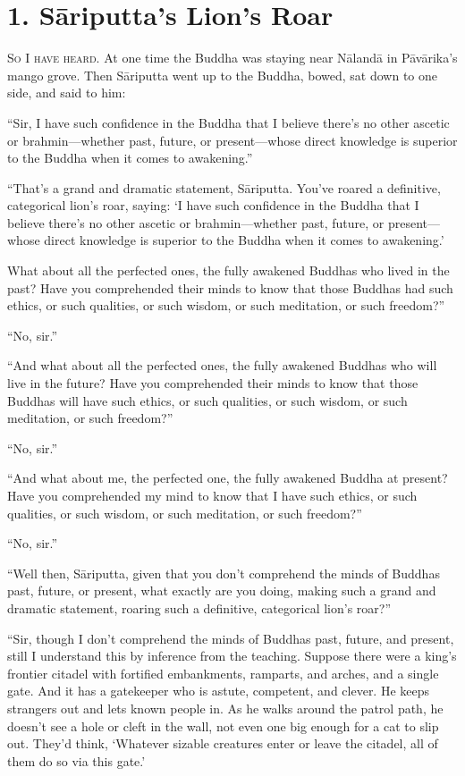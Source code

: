 \documentclass[12pt,openany]{book}%
\newcommand*{\scevam}[1]{\textsc{#1}}
\begin{document}
\section*{1. \textsanskrit{Sāriputta}’s Lion’s Roar }

\scevam{So I have heard. }At one time the Buddha was staying near \textsanskrit{Nālandā} in \textsanskrit{Pāvārika}’s mango grove. Then \textsanskrit{Sāriputta} went up to the Buddha, bowed, sat down to one side, and said to him: 

“Sir, I have such confidence in the Buddha that I believe there’s no other ascetic or brahmin—whether past, future, or present—whose direct knowledge is superior to the Buddha when it comes to awakening.” 

“That’s a grand and dramatic statement, \textsanskrit{Sāriputta}. You’ve roared a definitive, categorical lion’s roar, saying: ‘I have such confidence in the Buddha that I believe there’s no other ascetic or brahmin—whether past, future, or present—whose direct knowledge is superior to the Buddha when it comes to awakening.’ 

What about all the perfected ones, the fully awakened Buddhas who lived in the past? Have you comprehended their minds to know that those Buddhas had such ethics, or such qualities, or such wisdom, or such meditation, or such freedom?” 

“No, sir.” 

“And what about all the perfected ones, the fully awakened Buddhas who will live in the future? Have you comprehended their minds to know that those Buddhas will have such ethics, or such qualities, or such wisdom, or such meditation, or such freedom?” 

“No, sir.” 

“And what about me, the perfected one, the fully awakened Buddha at present? Have you comprehended my mind to know that I have such ethics, or such qualities, or such wisdom, or such meditation, or such freedom?” 

“No, sir.” 

“Well then, \textsanskrit{Sāriputta}, given that you don’t comprehend the minds of Buddhas past, future, or present, what exactly are you doing, making such a grand and dramatic statement, roaring such a definitive, categorical lion’s roar?” 

“Sir, though I don’t comprehend the minds of Buddhas past, future, and present, still I understand this by inference from the teaching. Suppose there were a king’s frontier citadel with fortified embankments, ramparts, and arches, and a single gate. And it has a gatekeeper who is astute, competent, and clever. He keeps strangers out and lets known people in. As he walks around the patrol path, he doesn’t see a hole or cleft in the wall, not even one big enough for a cat to slip out. They’d think, ‘Whatever sizable creatures enter or leave the citadel, all of them do so via this gate.’ 
\end{document}
